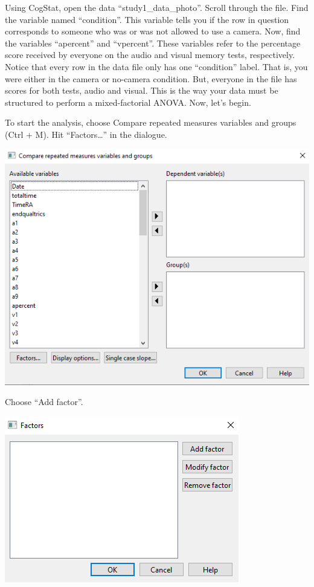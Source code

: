 \documentclass[
]{book}
\begin{document}
Using CogStat, open the data ``study1\_data\_photo''. Scroll through the file. Find the variable named ``condition''. This variable tells you if the row in question corresponds to someone who was or was not allowed to use a camera. Now, find the variables ``apercent'' and ``vpercent''. These variables refer to the percentage score received by everyone on the audio and visual memory tests, respectively. Notice that every row in the data file only has one ``condition'' label. That is, you were either in the camera or no-camera condition. But, everyone in the file has scores for both tests, audio and visual. This is the way your data must be structured to perform a mixed-factorial ANOVA. Now, let's begin.

To start the analysis, choose Compare repeated measures variables and groups (Ctrl + M).
Hit ``Factors\ldots{}'' in the dialogue.

\includegraphics{img/ch11/11.3CRMVG_window.png}

Choose ``Add factor''.

\includegraphics{img/ch11/11.3CRMVG_factorswindow.png}
\end{document}
